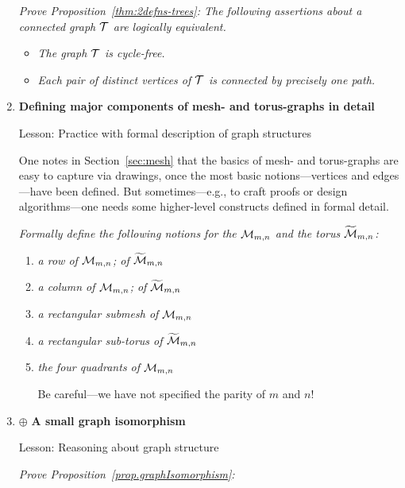 \begin{enumerate}
{\em Prove Proposition~\ref{thm:2defns-trees}:
The following assertions about a connected graph $\mbox{$\cal T$}$ are  logically equivalent.}
  \begin{itemize}
  \item
{\em The graph $\mbox{$\cal T$}$ is cycle-free.}
  \medskip\item
{\em Each pair of distinct vertices of $\mbox{$\cal T$}$ is connected by precisely one path.}
  \end{itemize}

\medskip\item
{\bf Defining major components of mesh- and torus-graphs in detail}

{\sc Lesson:} Practice with formal description of graph structures

\smallskip

One notes in Section~\ref{sec:mesh} that the basics of mesh- and torus-graphs are easy to capture via drawings, once the most basic notions---vertices and edges---have been defined.  But sometimes---e.g., to craft proofs or design algorithms---one needs some higher-level constructs defined in formal detail.

\smallskip

{\em Formally define the following notions for the $\mbox{$\cal M$}_{m,n}$ and the torus $\widetilde{\mbox{$\cal M$}}_{m,n}$:}
  \begin{enumerate}
  \item
{\em a {\em row} of $\mbox{$\cal M$}_{m,n}$; of $\widetilde{\mbox{$\cal M$}}_{m,n}$}
  \medskip\item
{\em a {\em column} of $\mbox{$\cal M$}_{m,n}$; of $\widetilde{\mbox{$\cal M$}}_{m,n}$}
  \medskip\item
{\em a {\em rectangular submesh} of $\mbox{$\cal M$}_{m,n}$}
  \medskip\item
{\em a {\em rectangular sub-torus} of $\widetilde{\mbox{$\cal M$}}_{m,n}$}
  \medskip\item
{\em the {\em four quadrants} of $\mbox{$\cal M$}_{m,n}$}

\smallskip

Be careful---we have not specified the parity of $m$ and $n$!
  \end{enumerate}

\medskip\item
$\oplus$
{\bf A small graph isomorphism}

{\sc Lesson:} Reasoning about graph structure

\smallskip

{\em Prove Proposition~\ref{prop.graphIsomorphism}:}

\smallskip


\end{enumerate}
